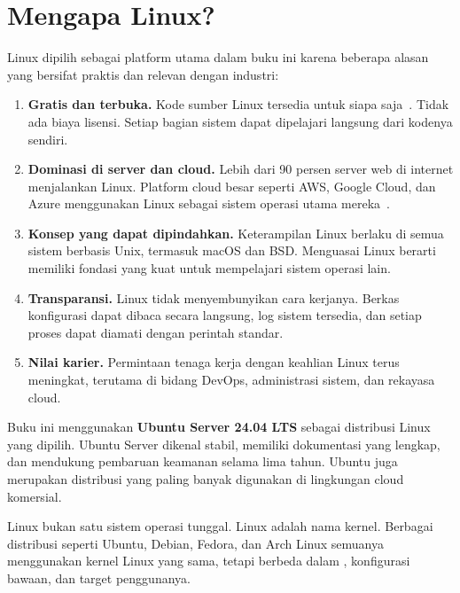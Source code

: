 \section{Mengapa Linux?}
\label{sec:why-linux}

Linux dipilih sebagai platform utama dalam buku ini karena beberapa alasan yang bersifat
praktis dan relevan dengan industri:

\begin{enumerate}
    \item \textbf{Gratis dan terbuka.} Kode sumber Linux tersedia untuk siapa saja~\cite{kernelorg2024}.
    Tidak ada biaya lisensi. Setiap bagian sistem dapat dipelajari langsung dari
    kodenya sendiri.

    \item \textbf{Dominasi di server dan cloud.} Lebih dari 90 persen server web di
    internet menjalankan Linux. Platform cloud besar seperti AWS, Google Cloud, dan Azure
    menggunakan Linux sebagai sistem operasi utama mereka~\cite{linuxfoundation2024}.

    \item \textbf{Konsep yang dapat dipindahkan.} Keterampilan Linux berlaku di semua
    sistem berbasis Unix, termasuk macOS dan BSD. Menguasai Linux berarti memiliki
    fondasi yang kuat untuk mempelajari sistem operasi lain.

    \item \textbf{Transparansi.} Linux tidak menyembunyikan cara kerjanya. Berkas
    konfigurasi dapat dibaca secara langsung, log sistem tersedia, dan setiap proses
    dapat diamati dengan perintah standar.

    \item \textbf{Nilai karier.} Permintaan tenaga kerja dengan keahlian Linux terus
    meningkat, terutama di bidang DevOps, administrasi sistem, dan rekayasa cloud.
\end{enumerate}

Buku ini menggunakan \textbf{Ubuntu Server 24.04 LTS} sebagai distribusi Linux yang
dipilih. Ubuntu Server dikenal stabil, memiliki dokumentasi yang lengkap, dan mendukung
pembaruan keamanan selama lima tahun. Ubuntu juga merupakan distribusi yang paling banyak
digunakan di lingkungan cloud komersial.

\begin{notebox}
Linux bukan satu sistem operasi tunggal. Linux adalah nama kernel. Berbagai distribusi
seperti Ubuntu, Debian, Fedora, dan Arch Linux semuanya menggunakan kernel Linux yang
sama, tetapi berbeda dalam , konfigurasi bawaan, dan
target penggunanya.
\end{notebox}

